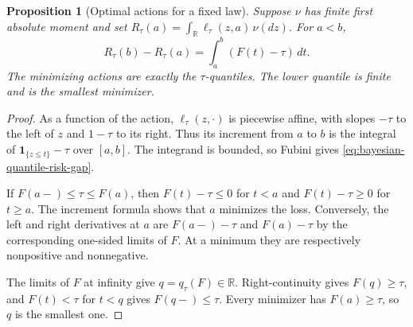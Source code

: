 \documentclass[11pt,oneside]{book}
\newtheorem{proposition}[theorem]{Proposition}
\theoremstyle{definition}
\theoremstyle{remark}
\newcommand{\R}{\mathbb R}
\begin{document}
\begin{proposition}[Optimal actions for a fixed law]
\label{prop:bayesian-quantile-loss-minimizers}
Suppose $\nu$ has finite first absolute moment and set
$R_\tau(a)=\int_{\R}\ell_\tau(z,a)\,\nu(dz)$. For $a<b$,
\begin{equation}
R_\tau(b)-R_\tau(a)=\int_a^b (F(t)-\tau)\,dt.
\label{eq:bayesian-quantile-risk-gap}
\end{equation}
The minimizing actions are exactly the $\tau$-quantiles.
The lower quantile is finite and is the smallest minimizer.
\end{proposition}
\begin{proof}
As a function of the action, $\ell_\tau(z,\cdot)$ is piecewise affine,
with slopes $-\tau$ to the left of $z$ and $1-\tau$ to its right.
Thus its increment from $a$ to $b$ is the integral of
$\mathbf 1_{\{z\leq t\}}-\tau$ over $[a,b]$. The integrand is bounded,
so Fubini gives \eqref{eq:bayesian-quantile-risk-gap}.

If $F(a-)\leq\tau\leq F(a)$, then $F(t)-\tau\leq0$ for $t<a$
and $F(t)-\tau\geq0$ for $t\geq a$. The increment formula shows
that $a$ minimizes the loss. Conversely, the left and right
derivatives at $a$ are $F(a-)-\tau$ and $F(a)-\tau$ by the
corresponding one-sided limits of $F$. At a minimum they are
respectively nonpositive and nonnegative.

The limits of $F$ at infinity give $q=q_\tau(F)\in\R$.
Right-continuity gives $F(q)\geq\tau$, and $F(t)<\tau$ for
$t<q$ gives $F(q-)\leq\tau$. Every minimizer has $F(a)\geq\tau$,
so $q$ is the smallest one.
\end{proof}
\end{document}
